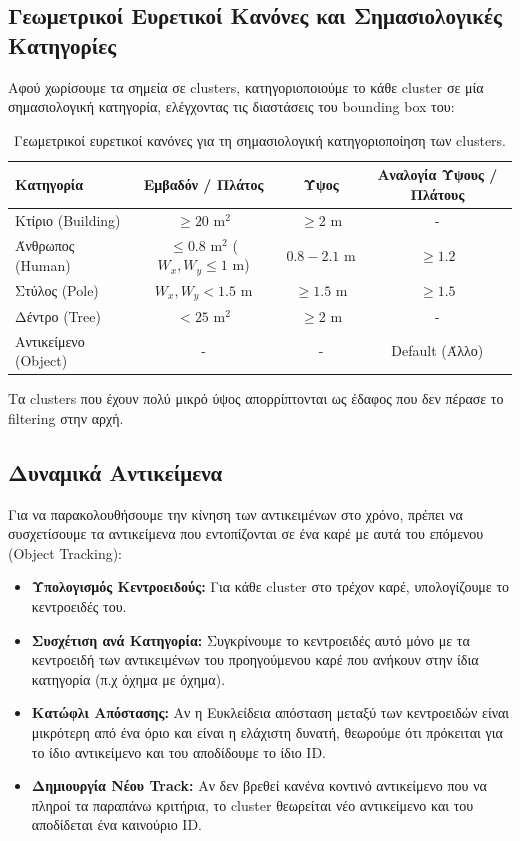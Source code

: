 \documentclass[acmsmall,screen,nonacm]{acmart}
\begin{document}
	\subsection{Γεωμετρικοί Ευρετικοί Κανόνες και Σημασιολογικές Κατηγορίες}
	Αφού χωρίσουμε τα σημεία σε clusters, κατηγοριοποιούμε το κάθε cluster σε μία σημασιολογική κατηγορία, ελέγχοντας τις διαστάσεις του bounding box του:
	\begin{table}[h!]
		\centering
		\begin{tabular}{|l|c|c|c|}
			\hline
			\textbf{Κατηγορία} & \textbf{Εμβαδόν / Πλάτος} & \textbf{Ύψος} & \textbf{Αναλογία Ύψους / Πλάτους} \\ \hline
			Κτίριο (Building) & $\ge 20\text{ m}^2$ & $\ge 2\text{ m}$ & - \\ \hline
			Άνθρωπος (Human) & $\le 0.8\text{ m}^2$ ($W_x, W_y \le 1\text{ m}$) & $0.8 - 2.1\text{ m}$ & $\ge 1.2$ \\ \hline
			Στύλος (Pole) & $W_x, W_y < 1.5\text{ m}$ & $\ge 1.5\text{ m}$ & $\ge 1.5$ \\ \hline
			Δέντρο (Tree) & $< 25\text{ m}^2$ & $\ge 2\text{ m}$ & - \\ \hline
			Αντικείμενο (Object) & - & - & Default (Άλλο) \\ \hline
		\end{tabular}
		\caption{Γεωμετρικοί ευρετικοί κανόνες για τη σημασιολογική κατηγοριοποίηση των clusters.}
		\label{tab:heuristics}
	\end{table}
	Τα clusters που έχουν πολύ μικρό ύψος απορρίπτονται ως έδαφος που δεν πέρασε το filtering στην αρχή.

	\subsection{Δυναμικά Αντικείμενα}
	
	Για να παρακολουθήσουμε την κίνηση των αντικειμένων στο χρόνο, πρέπει να συσχετίσουμε τα αντικείμενα που εντοπίζονται σε ένα καρέ με αυτά του επόμενου (Object Tracking):
	\begin{itemize}
		\item \textbf{Υπολογισμός Κεντροειδούς:} Για κάθε cluster στο τρέχον καρέ, υπολογίζουμε το κεντροειδές του.
		\item \textbf{Συσχέτιση ανά Κατηγορία:} Συγκρίνουμε το κεντροειδές αυτό μόνο με τα κεντροειδή των αντικειμένων του προηγούμενου καρέ που ανήκουν στην ίδια κατηγορία (π.χ όχημα με όχημα).
		\item \textbf{Κατώφλι Απόστασης:} Αν η Ευκλείδεια απόσταση μεταξύ των κεντροειδών είναι μικρότερη από ένα όριο και είναι η ελάχιστη δυνατή, θεωρούμε ότι πρόκειται για το ίδιο αντικείμενο και του αποδίδουμε το ίδιο ID.
		\item \textbf{Δημιουργία Νέου Track:} Αν δεν βρεθεί κανένα κοντινό αντικείμενο που να πληροί τα παραπάνω κριτήρια, το cluster θεωρείται νέο αντικείμενο και του αποδίδεται ένα καινούριο ID.
	\end{itemize}
	
\end{document}
